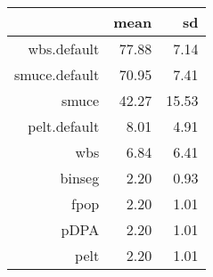 \begin{tabular}{rrr}
  \hline
 & mean & sd \\ 
  \hline
wbs.default & 77.88 & 7.14 \\ 
  smuce.default & 70.95 & 7.41 \\ 
  smuce & 42.27 & 15.53 \\ 
  pelt.default & 8.01 & 4.91 \\ 
  wbs & 6.84 & 6.41 \\ 
  binseg & 2.20 & 0.93 \\ 
  fpop & 2.20 & 1.01 \\ 
  pDPA & 2.20 & 1.01 \\ 
  pelt & 2.20 & 1.01 \\ 
   \hline
\end{tabular}
